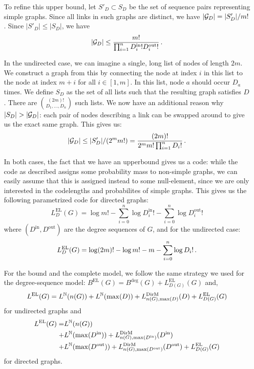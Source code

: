 To refine this upper bound, let $S'_D \subset S_D$ be the set of sequence pairs representing simple graphs. Since all links in such graphs are distinct, we have $|{\mathcal G}_D| = |S'_D|/m!$. Since $|S'_D| \leq |S_D|$, we have \footnotemark
\[
|{\mathcal G}_D| \leq \frac{m!}{\prod_{i=1}^n D^\text{in}_i ! D^\text{out}_i !} \,\text{.}
\]


In the undirected case, we can imagine a single, long list of nodes of length $2m$. We construct a graph from this by connecting the node at index $i$ in this list to the node at index $m+i$ for all $i \in [1, m]$. In this list, node $a$ should occur $D_a$ times. We define $S_D$ as the set of all lists such that the resulting graph satisfies $D$. There are $(2m)! \choose D_1, \ldots, D_n$ such lists.
We now have an additional reason why $|S_D| > |{\mathcal G}_D|$: each pair of nodes describing a link can be swapped around to give us the exact same graph. This gives us:
\[
|{\mathcal G}_D| \leq |S'_D| / (2^m m!) = \frac{(2m)!}{2^m m! \prod_{i=1}^n D_i!} \,\text{.}
\]

In both cases, the fact that we have an upperbound gives us a code: while the code as described assigns some probability mass to non-simple graphs, we can easily assume that this is assigned instead to some null-element, since we are only interested in the codelengths and probabilites of simple graphs. This gives us the following parametrized code for directed graphs:
\[
L^\text{EL}_D(G) = \log m! - \sum_{i=0}^n \log D_i^\text{in}! - \sum_{i=0}^n \log D_i^\text{out}!   
\]
where $(D^\text{in}, D^\text{out})$ are the degree sequences of $G$, and for the undirected case:
\[
L^\text{EL}_D(G) = \log (2m)! - \log m! - m - \sum_{i=0}^n \log D_i! \,\text{.}   
\]

For the bound and the complete model, we follow the same strategy we used for the degree-sequence model: $B^\text{EL}(G) = B^\text{deg}(G) + L^\text{EL}_{D(G)}(G)$ and, 
\[
L^\text{EL}(G) = L^{\mathbb N}(n(G)) + L^{\mathbb N}(\max(D)) + L^\text{DirM}_{n(G), \max(D)}(D) + L^\text{EL}_{D(G)}(G)
\] for undirected graphs and 
\begin{align*}
L^\text{EL}(G) = &L^{\mathbb N}(n(G)) \\ 
 + &L^{\mathbb N}(\max(D^\text{in})) + L^\text{DirM}_{n(G), \max(D^\text{in})}(D^\text{in})\\
 + &L^{\mathbb N}(\max(D^\text{out})) + L^\text{DirM}_{n(G), \max(D^\text{out})}(D^\text{out}) + L^\text{EL}_{D(G)}(G)
\end{align*} for directed graphs.

